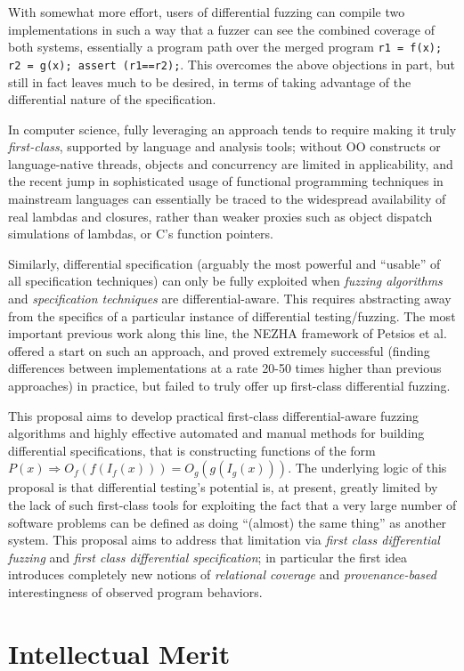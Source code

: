 With somewhat more effort, users of differential fuzzing can compile two
implementations in such a way that a fuzzer can see the combined
coverage of both systems, essentially a program path over the merged
program {\tt r1 =
  f(x); r2 = g(x); assert (r1==r2);}.  This overcomes the above
objections in part, but still in fact leaves much to be desired, in terms of
taking advantage of the differential nature of the specification.

In computer science, fully leveraging an approach tends to require
making it truly \emph{first-class}, supported by language and analysis
tools; without OO constructs or language-native threads, objects and
concurrency are limited in applicability, and the recent jump in
sophisticated usage of functional programming techniques in mainstream
languages can essentially be traced to the widespread availability of
real lambdas and closures, rather than weaker proxies such as object
dispatch simulations of lambdas, or C's function pointers.

Similarly, differential specification (arguably the most powerful and
``usable'' of all specification techniques) can only be fully
exploited when \emph{fuzzing algorithms} and \emph{specification
  techniques} are differential-aware.  This requires abstracting away
from the specifics of a particular instance of differential
testing/fuzzing.  The most important previous work along this line,
the NEZHA framework of Petsios et al.~\cite{nezha} offered a start on
such an approach, and proved extremely successful (finding differences
between implementations at a rate 20-50 times higher than previous
approaches) in practice, but failed to truly offer up first-class
differential fuzzing.

This proposal aims to develop practical first-class differential-aware
fuzzing algorithms and highly effective automated and manual methods
for building differential specifications, that is constructing
functions of the form $P(x)
\Rightarrow O_f(f(I_f(x))) = O_g(g(I_g(x)))$.  The underlying logic of
this proposal is that differential testing's potential is, at present,
greatly limited by the lack of such first-class tools for exploiting
the fact that a very large number of software problems can be defined
as doing ``(almost) the same thing'' as another system.  This proposal
aims to address that limitation via \emph{first class differential
  fuzzing} and \emph{first class differential specification}; in
particular the first idea introduces completely new notions of
\emph{relational coverage} and \emph{provenance-based} interestingness
of observed program behaviors.

\section{Intellectual Merit}
